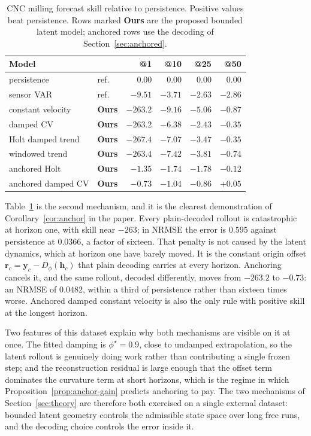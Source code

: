 \documentclass[a4paper,fleqn]{cas-sc}
\newcommand{\tinytable}{\scriptsize}
\newcommand{\verytighttables}{%
  \setlength{\tabcolsep}{3.5pt}%
  \renewcommand{\arraystretch}{1.05}%
}
\newcommand{\h}{\mathbf{h}}
\newcommand{\y}{\mathbf{y}}
\begin{document}
\begin{table}[t]
\centering
\caption{CNC milling forecast skill relative to persistence. Positive values
beat persistence. Rows marked \textbf{Ours} are the proposed bounded latent
model; anchored rows use the decoding of Section~\ref{sec:anchored}.}
\label{tab:milling-skill}
\tinytable
\verytighttables
\begin{tabular}{@{}llrrrr@{}}
\toprule
Model & & @1 & @10 & @25 & @50 \\
\midrule
persistence        & ref.            & $0.00$    & $0.00$  & $0.00$  & $0.00$ \\
sensor VAR         & ref.            & $-9.51$   & $-3.71$ & $-2.63$ & $-2.86$ \\
\midrule
constant velocity  & \textbf{Ours} & $-263.2$  & $-9.16$ & $-5.06$ & $-0.87$ \\
damped CV          & \textbf{Ours} & $-263.2$  & $-6.38$ & $-2.43$ & $-0.35$ \\
Holt damped trend  & \textbf{Ours} & $-267.4$  & $-7.07$ & $-3.47$ & $-0.35$ \\
windowed trend     & \textbf{Ours} & $-263.4$  & $-7.42$ & $-3.81$ & $-0.74$ \\
anchored Holt      & \textbf{Ours} & $-1.35$   & $-1.74$ & $-1.78$ & $-0.12$ \\
anchored damped CV & \textbf{Ours} & $\mathbf{-0.73}$ & $\mathbf{-1.04}$ & $\mathbf{-0.86}$ & $\mathbf{+0.05}$ \\
\bottomrule
\end{tabular}
\end{table}

Table~\ref{tab:milling-skill} is the second mechanism, and it is the clearest
demonstration of Corollary~\ref{cor:anchor} in the paper. Every plain-decoded
rollout is catastrophic at horizon one, with skill near $-263$; in NRMSE the
error is $0.595$ against persistence at $0.0366$, a factor of sixteen. That
penalty is not caused by the latent dynamics, which at horizon one have barely
moved. It is the constant origin offset $\mathbf{r}_c=\y_c-D_\phi(\h_c)$ that
plain decoding carries at every horizon. Anchoring cancels it, and the same
rollout, decoded differently, moves from $-263.2$ to $-0.73$: an NRMSE of
$0.0482$, within a third of persistence rather than sixteen times worse.
Anchored damped constant velocity is also the only rule with positive skill at
the longest horizon.

Two features of this dataset explain why both mechanisms are visible on it at
once. The fitted damping is $\phi^\star=0.9$, close to undamped extrapolation,
so the latent rollout is genuinely doing work rather than contributing a single
frozen step; and the reconstruction residual is large enough that the offset
term dominates the curvature term at short horizons, which is the regime in
which Proposition~\ref{prop:anchor-gain} predicts anchoring to pay. The two
mechanisms of Section~\ref{sec:theory} are therefore both exercised on a single
external dataset: bounded latent geometry controls the admissible state space
over long free runs, and the decoding choice controls the error inside it.
\end{document}
